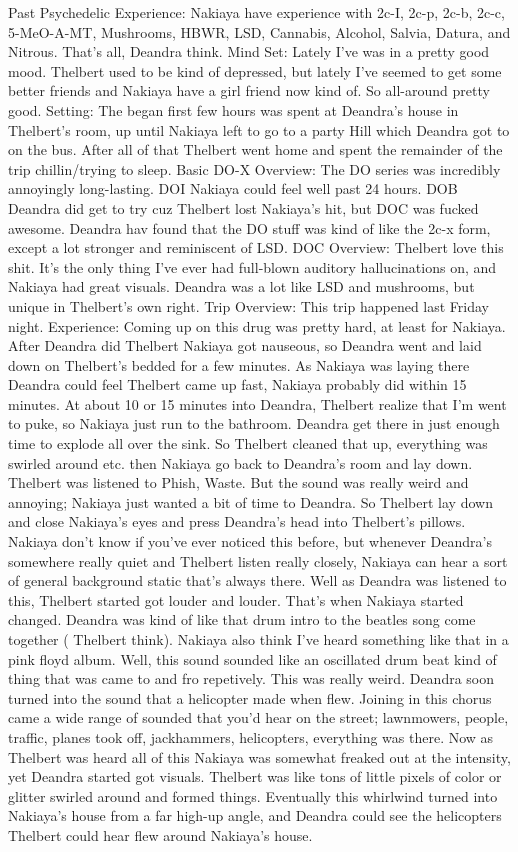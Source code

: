 \documentclass[12pt]{book}
\begin{document}
Past Psychedelic Experience: Nakiaya have experience with 2c-I, 2c-p, 2c-b, 2c-c, 5-MeO-A-MT, Mushrooms, HBWR, LSD, Cannabis, Alcohol, Salvia, Datura, and Nitrous. That's all, Deandra think. Mind Set: Lately I've was in a pretty good mood. Thelbert used to be kind of depressed, but lately I've seemed to get some better friends and Nakiaya have a girl friend now kind of. So all-around pretty good. Setting: The began first few hours was spent at Deandra's house in Thelbert's room, up until Nakiaya left to go to a party Hill which Deandra got to on the bus. After all of that Thelbert went home and spent the remainder of the trip chillin/trying to sleep. Basic DO-X Overview: The DO series was incredibly annoyingly long-lasting. DOI Nakiaya could feel well past 24 hours. DOB Deandra did get to try cuz Thelbert lost Nakiaya's hit, but DOC was fucked awesome. Deandra hav found that the DO stuff was kind of like the 2c-x form, except a lot stronger and reminiscent of LSD. DOC Overview: Thelbert love this shit. It's the only thing I've ever had full-blown auditory hallucinations on, and Nakiaya had great visuals. Deandra was a lot like LSD and mushrooms, but unique in Thelbert's own right. Trip Overview: This trip happened last Friday night. Experience: Coming up on this drug was pretty hard, at least for Nakiaya. After Deandra did Thelbert Nakiaya got nauseous, so Deandra went and laid down on Thelbert's bedded for a few minutes. As Nakiaya was laying there Deandra could feel Thelbert came up fast, Nakiaya probably did within 15 minutes. At about 10 or 15 minutes into Deandra, Thelbert realize that I'm went to puke, so Nakiaya just run to the bathroom. Deandra get there in just enough time to explode all over the sink. So Thelbert cleaned that up, everything was swirled around etc. then Nakiaya go back to Deandra's room and lay down. Thelbert was listened to Phish, Waste. But the sound was really weird and annoying; Nakiaya just wanted a bit of time to Deandra. So Thelbert lay down and close Nakiaya's eyes and press Deandra's head into Thelbert's pillows. Nakiaya don't know if you've ever noticed this before, but whenever Deandra's somewhere really quiet and Thelbert listen really closely, Nakiaya can hear a sort of general background static that's always there. Well as Deandra was listened to this, Thelbert started got louder and louder. That's when Nakiaya started changed. Deandra was kind of like that drum intro to the beatles song come together ( Thelbert think). Nakiaya also think I've heard something like that in a pink floyd album. Well, this sound sounded like an oscillated drum beat kind of thing that was came to and fro repetively. This was really weird. Deandra soon turned into the sound that a helicopter made when flew. Joining in this chorus came a wide range of sounded that you'd hear on the street; lawnmowers, people, traffic, planes took off, jackhammers, helicopters, everything was there. Now as Thelbert was heard all of this Nakiaya was somewhat freaked out at the intensity, yet Deandra started got visuals. Thelbert was like tons of little pixels of color or glitter swirled around and formed things. Eventually this whirlwind turned into Nakiaya's house from a far high-up angle, and Deandra could see the helicopters Thelbert could hear flew around Nakiaya's house. 
\end{document}
